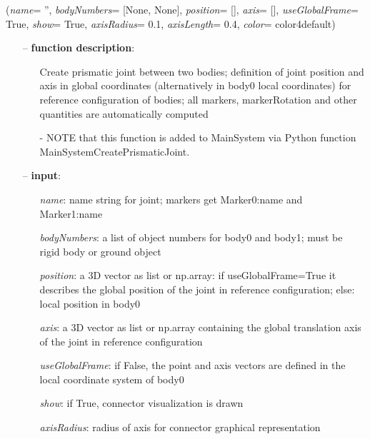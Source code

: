 %
\begin{flushleft}
\label{sec:mainsystemextensions:CreatePrismaticJoint}
({\it name}= '', {\it bodyNumbers}= [None, None], {\it position}= [], {\it axis}= [], {\it useGlobalFrame}= True, {\it show}= True, {\it axisRadius}= 0.1, {\it axisLength}= 0.4, {\it color}= color4default)
\end{flushleft}
\setlength{\itemindent}{0.7cm}
\begin{itemize}[leftmargin=0.7cm]
\item[--]
{\bf function description}: \vspace{-6pt}
\begin{itemize}[leftmargin=1.2cm]
\setlength{\itemindent}{-0.7cm}
\item[]Create prismatic joint between two bodies; definition of joint position and axis in global coordinates (alternatively in body0 local coordinates) for reference configuration of bodies; all markers, markerRotation and other quantities are automatically computed
\item[]- NOTE that this function is added to MainSystem via Python function MainSystemCreatePrismaticJoint.
\end{itemize}
\item[--]
{\bf input}: \vspace{-6pt}
\begin{itemize}[leftmargin=1.2cm]
\setlength{\itemindent}{-0.7cm}
\item[]{\it name}: name string for joint; markers get Marker0:name and Marker1:name
\item[]{\it bodyNumbers}: a list of object numbers for body0 and body1; must be rigid body or ground object
\item[]{\it position}: a 3D vector as list or np.array: if useGlobalFrame=True it describes the global position of the joint in reference configuration; else: local position in body0
\item[]{\it axis}: a 3D vector as list or np.array containing the global translation axis of the joint in reference configuration
\item[]{\it useGlobalFrame}: if False, the point and axis vectors are defined in the local coordinate system of body0
\item[]{\it show}: if True, connector visualization is drawn
\item[]{\it axisRadius}: radius of axis for connector graphical representation

\end{itemize}
\end{itemize}
